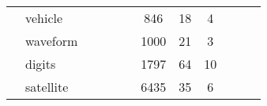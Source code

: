 \begin{tabular}{l l C{0.6\tblw} C{0.6\tblw} C{0.6\tblw} C{0.6\tblw} C{0.6\tblw}  C{0.6\tblw}  C{0.6\tblw} C{0.6\tblw}  C{0.6\tblw}  C{0.6\tblw}}
& \sc vehicle &  &  &  &  & 846 & 18 & 4 \\
& \sc waveform &  &  &  &  & 1000 & 21 & 3 \\
& \sc digits &  &  &  &  & 1797 & 64 & 10 \\
& \sc satellite &  &  &  &  & 6435 & 35 & 6 \\
\midrule
\bottomrule
\end{tabular}
